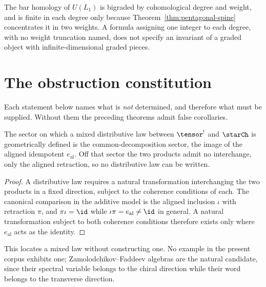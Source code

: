 \begin{remark}
The bar homology of $U(L_1)$ is bigraded by cohomological degree and weight,
and is finite in each degree only because Theorem~\ref{thm:pentagonal-spine}
concentrates it in two weights. A formula assigning one integer to each degree,
with no weight truncation named, does not specify an invariant of a graded
object with infinite-dimensional graded pieces.
\end{remark}

\chapter{The obstruction constitution}
\label{ch:obstructions}

Each statement below names what is \emph{not} determined, and therefore what
must be supplied. Without them the preceding theorems admit false corollaries.

\begin{proposition}
\label{prop:lambda-sector-spine}
The sector on which a mixed distributive law between $\tensor^!$ and $\starCh$
is geometrically defined is the common-decomposition sector, the image of the
aligned idempotent $e_{\mathrm{al}}$. Off that sector the two products admit no
interchange, only the aligned retraction, so no distributive law can be
written.
\end{proposition}
\begin{proof}
A distributive law requires a natural transformation interchanging the two
products in a fixed direction, subject to the coherence conditions of each. The
canonical comparison in the additive model is the aligned inclusion $\iota$ with
retraction $\pi$, and $\pi\iota=\id$ while $\iota\pi=e_{\mathrm{al}}\ne\id$ in
general. A natural transformation subject to both coherence conditions
therefore exists only where $e_{\mathrm{al}}$ acts as the identity.
\end{proof}

This locates a mixed law without constructing one. No example in the present
corpus exhibits one; Zamolodchikov--Faddeev algebras are the natural candidate,
since their spectral variable belongs to the chiral direction while their word
belongs to the transverse direction.

